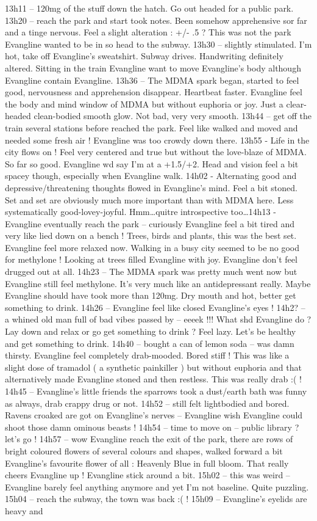 \documentclass[12pt]{book}
\begin{document}
13h11 -- 120mg of the stuff down the hatch. Go out headed for a public park. 13h20 -- reach the park and start took notes. Been somehow apprehensive sor far and a tinge nervous. Feel a slight alteration : +/- .5 ? This was not the park Evangline wanted to be in so head to the subway. 13h30 -- slightly stimulated. I'm hot, take off Evangline's sweatshirt. Subway drives. Handwriting definitely altered. Sitting in the train Evangline want to move Evangline's body although Evangline contain Evangline. 13h36 -- The MDMA spark began, started to feel good, nervousness and apprehension disappear. Heartbeat faster. Evangline feel the body and mind window of MDMA but without euphoria or joy. Just a clear-headed clean-bodied smooth glow. Not bad, very very smooth. 13h44 -- get off the train several stations before reached the park. Feel like walked and moved and needed some fresh air ! Evangline was too crowdy down there. 13h55 - Life in the city flows on ! Feel very centered and true but without the love-blaze of MDMA. So far so good. Evangline wd say I'm at a +1.5/+2. Head and vision feel a bit spacey though, especially when Evangline walk. 14h02 - Alternating good and depressive/threatening thoughts flowed in Evangline's mind. Feel a bit stoned. Set and set are obviously much more important than with MDMA here. Less systematically good-lovey-joyful. Hmm\ldots quitre introspective too\ldots 14h13 - Evangline eventually reach the park -- curiously Evangline feel a bit tired and very like lied down on a bench ! Trees, birds and plants, this was the best set. Evangline feel more relaxed now. Walking in a busy city seemed to be no good for methylone ! Looking at trees filled Evangline with joy. Evangline don't feel drugged out at all. 14h23 -- The MDMA spark was pretty much went now but Evangline still feel methylone. It's very much like an antidepressant really. Maybe Evangline should have took more than 120mg. Dry mouth and hot, better get something to drink. 14h26 -- Evangline feel like closed Evangline's eyes ! 14h2? -- a whined old man full of bad vibes passed by -- eeeek !!! What shd Evangline do ? Lay down and relax or go get something to drink ? Feel lazy. Let's be healthy and get something to drink. 14h40 -- bought a can of lemon soda -- was damn thirsty. Evangline feel completely drab-mooded. Bored stiff ! This was like a slight dose of tramadol ( a synthetic painkiller ) but without euphoria and that alternatively made Evangline stoned and then restless. This was really drab :( ! 14h45 -- Evangline's little friends the sparrows took a dust/earth bath was funny as always, drab crappy drug or not. 14h52 -- still felt lightbodied and bored. Ravens croaked are got on Evangline's nerves -- Evangline wish Evangline could shoot those damn ominous beasts ! 14h54 -- time to move on -- public library ? let's go ! 14h57 -- wow Evangline reach the exit of the park, there are rows of bright coloured flowers of several colours and shapes, walked forward a bit Evangline's favourite flower of all : Heavenly Blue in full bloom. That really cheers Evangline up ! Evangline stick around a bit. 15h02 -- this was weird -- Evangline barely feel anything anymore and yet I'm not baseline. Quite puzzling. 15h04 -- reach the subway, the town was back :( ! 15h09 -- Evangline's eyelids are heavy and 
\end{document}
